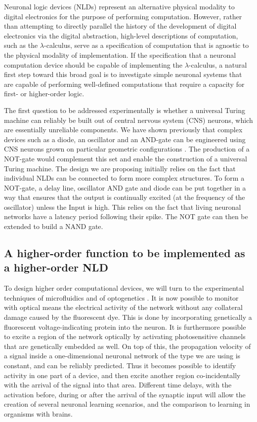 Neuronal logic devices (NLDs) represent an alternative physical modality
to digital electronics for the purpose of performing computation.
However, rather than attempting to directly parallel the history of the
development of digital electronics via the digital abstraction,
high-level descriptions of computation, such as the
$\lambda$-calculus, serve as a specification
of computation that is agnostic to the physical modality of
implementation. If the specification that a neuronal computation device
should be capable of implementing the
$\lambda$-calculus, a natural first step
toward this broad goal is to investigate simple neuronal systems that
are capable of performing well-defined computations that require a
capacity for first- or higher-order logic.

The first question to be addressed experimentally is whether a universal Turing machine can reliably be built out of central nervous system (CNS) neurons, which are essentially unreliable components. We have shown previously that complex devices such as a diode, an oscillator and an AND-gate can be engineered using CNS neurons grown on particular geometric configurations \cite{Feinerman2008}. The production of a NOT-gate would complement this set and enable the construction of a universal Turing machine.
The design we are proposing initially relies on the fact that individual NLDs can be connected to form more complex structures. To form a NOT-gate, a delay line, oscillator AND gate and diode can be put together in a way that ensures that the output is continually excited (at the frequency of the oscillator) unless the Input is high. This relies on the fact that living neuronal networks have a latency period following their spike. The NOT gate can then be extended to build a NAND gate.

\subsection{A higher-order function to be implemented as a higher-order NLD}

To design higher order computational devices, we will turn to the experimental techniques of microfluidics and of optogenetics \cite{Yizhar2011,Kralj2012}.
It is now possible to monitor with optical means the electrical activity of the network without any collateral damage caused by the fluorescent dye. This is done by incorporating genetically a fluorescent voltage-indicating protein into the neuron. It is furthermore possible to excite a region of the network optically by activating photosensitive channels that are genetically embedded as well. On top of this, the propagation velocity of a signal inside a one-dimensional neuronal network of the type we are using is constant, and can be reliably predicted. Thus it becomes possible to identify activity in one part of a device, and then excite another region co-incidentally with the arrival of the signal into that area. Different time delays, with the activation before, during or after the arrival of the synaptic input will allow the creation of several neuronal learning scenarios, and the comparison to learning in organisms with brains.

